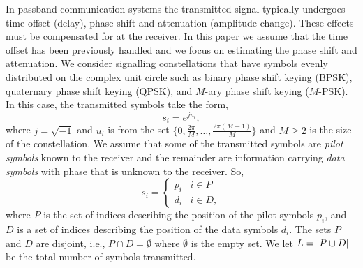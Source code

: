 \documentclass[journal]{IEEEtran}
\begin{document}
In passband communication systems the transmitted signal typically undergoes time offset (delay), phase shift and attenuation (amplitude change).  These effects must be compensated for at the receiver. In this paper we assume that the time offset has been previously handled and we focus on estimating the phase shift and attenuation.  We consider signalling constellations that have symbols evenly distributed on the complex unit circle such as binary phase shift keying (BPSK), quaternary phase shift keying (QPSK), and $M$-ary phase shift keying ($M$-PSK).  In this case, the transmitted symbols take the form,
\[
s_i = e^{j u_i},
\]
where $j = \sqrt{-1}$ and $u_i$ is from the set $\{0, \tfrac{2\pi}{M}, \dots, \tfrac{2\pi(M-1)}{M}\}$ and $M \geq 2$ is the size of the constellation.  We assume that some of the transmitted symbols are \emph{pilot symbols} known to the receiver and the remainder are information carrying \emph{data symbols} with phase that is unknown to the receiver.  So,
\[
s_i = \begin{cases}
p_i & i \in P \\
d_i & i \in D,
\end{cases}
\]
where $P$ is the set of indices describing the position of the pilot symbols $p_i$, and $D$ is a set of indices describing the position of the data symbols $d_i$.  The sets $P$ and $D$ are disjoint, i.e., $P \cap D = \emptyset$  where $\emptyset$ is the empty set. We let $L = {\left\vert P \cup D \right\vert}$ be the total number of symbols transmitted.
\end{document}
